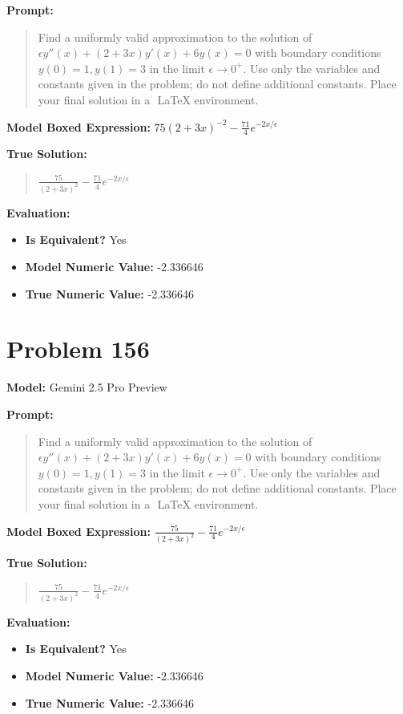 \documentclass{article}
\begin{document}
{\textbf{Prompt:}
\begin{quote}
Find a uniformly valid approximation to the solution of $\epsilon y''(x)+(2+3x)y'(x)+6y(x)=0$ with boundary conditions $y(0)=1, y(1)=3$ in the limit $\epsilon \to 0^+$. Use only the variables and constants given in the problem; do not define additional constants. Place your final solution in a $\boxed{}$ LaTeX environment.
\end{quote}
\textbf{Model Boxed Expression:} $75(2+3x)^{-2} - \frac{71}{4}e^{-2x/\epsilon}$

\textbf{True Solution:}
\begin{quote}
$\frac{75}{(2+3x)^2}-\frac{71}{4}e^{-2x/ \epsilon}$
\end{quote}

\textbf{Evaluation:}
\begin{itemize}
\item \textbf{Is Equivalent?} Yes
\item \textbf{Model Numeric Value:} -2.336646
\item \textbf{True Numeric Value:} -2.336646
\end{itemize}
\vspace{1cm}
\section*{Problem 156}
\textbf{Model:} Gemini 2.5 Pro Preview

\textbf{Prompt:}
\begin{quote}
Find a uniformly valid approximation to the solution of $\epsilon y''(x)+(2+3x)y'(x)+6y(x)=0$ with boundary conditions $y(0)=1, y(1)=3$ in the limit $\epsilon \to 0^+$. Use only the variables and constants given in the problem; do not define additional constants. Place your final solution in a $\boxed{}$ LaTeX environment.
\end{quote}
\textbf{Model Boxed Expression:} $\frac{75}{(2+3x)^2} - \frac{71}{4}e^{-2x/\epsilon}$

\textbf{True Solution:}
\begin{quote}
$\frac{75}{(2+3x)^2}-\frac{71}{4}e^{-2x/ \epsilon}$
\end{quote}

\textbf{Evaluation:}
\begin{itemize}
\item \textbf{Is Equivalent?} Yes
\item \textbf{Model Numeric Value:} -2.336646
\item \textbf{True Numeric Value:} -2.336646
\end{itemize}
\vspace{1cm}
}
\end{document}

